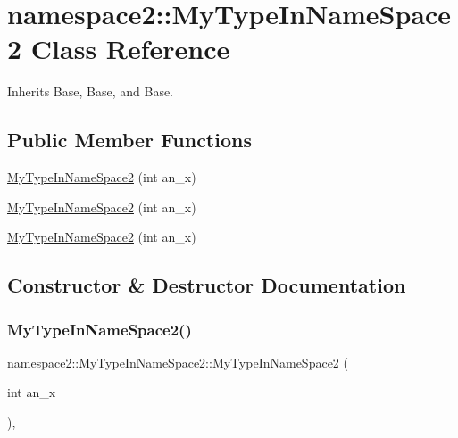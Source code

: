 \hypertarget{classnamespace2_1_1_my_type_in_name_space2}{}\section{namespace2\+::My\+Type\+In\+Name\+Space2 Class Reference}
\label{classnamespace2_1_1_my_type_in_name_space2}


Inherits Base, Base, and Base.

\subsection*{Public Member Functions}
\begin{DoxyCompactItemize}
\item 
\mbox{\hyperlink{classnamespace2_1_1_my_type_in_name_space2_a033025628289dbf29022b2bfbe66f53e}{My\+Type\+In\+Name\+Space2}} (int an\+\_\+x)
\item 
\mbox{\hyperlink{classnamespace2_1_1_my_type_in_name_space2_a033025628289dbf29022b2bfbe66f53e}{My\+Type\+In\+Name\+Space2}} (int an\+\_\+x)
\item 
\mbox{\hyperlink{classnamespace2_1_1_my_type_in_name_space2_a033025628289dbf29022b2bfbe66f53e}{My\+Type\+In\+Name\+Space2}} (int an\+\_\+x)
\end{DoxyCompactItemize}


\subsection{Constructor \& Destructor Documentation}
\mbox{\label{classnamespace2_1_1_my_type_in_name_space2_a033025628289dbf29022b2bfbe66f53e}} 
\subsubsection{\texorpdfstring{MyTypeInNameSpace2()}{MyTypeInNameSpace2()}\hspace{0.1cm}{\footnotesize\ttfamily [1/3]}}
{\footnotesize\ttfamily namespace2\+::\+My\+Type\+In\+Name\+Space2\+::\+My\+Type\+In\+Name\+Space2 (\begin{DoxyParamCaption}\item[{int}]{an\+\_\+x }\end{DoxyParamCaption})\hspace{0.3cm}{\ttfamily [inline]}, {\ttfamily [explicit]}}

